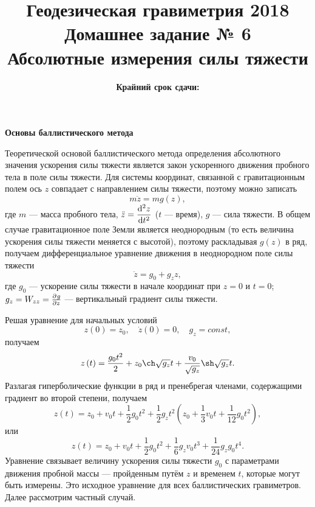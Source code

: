\documentclass[12pt, a4paper]{article}
\title{{\Large Геодезическая гравиметрия 2018}\\ 
    {\bf\Large Домашнее задание № 6} \\
    {\bf\Large Абсолютные измерения силы тяжести}
}
\author{}
\date{\normalsize\bf Крайний срок сдачи: \DTMusedate{deadline}}
\theoremstyle{remark}
\begin{document}
\maketitle
\thispagestyle{empty}
\begin{center}
    \textbf{Основы баллистического метода}
\end{center}

Теоретической основой баллистического метода определения абсолютного значения ускорения силы тяжести
является закон ускоренного движения пробного тела в поле силы тяжести. Для системы координат,
связанной с гравитационным полем ось $z$ совпадает с направлением силы тяжести, поэтому можно записать
\begin{equation*}
    m \ddot{z} = mg\left( z \right),
\end{equation*}
где $m$ --- масса пробного тела, $\ddot{z} = \dod[2]{z}{t}$ ($t$ --- время),
$g$ --- сила тяжести. 
В общем случае гравитационное поле Земли является неоднородным (то есть величина ускорения силы
тяжести меняется с высотой), поэтому раскладывая $g\left( z
\right)$ в ряд, получаем дифференциальное уравнение движения в неоднородном поле
силы тяжести
\begin{equation*}
    \ddot{z} = g_0 + g_z z,
\end{equation*}
где $g_0$ --- ускорение силы тяжести в начале координат при $z = 0$ и $t = 0$; $g_z = W_{zz} =
\pd{g}{z}$ --- вертикальный градиент силы тяжести.

Решая уравнение для начальных условий 
\begin{equation*}
    z\left( 0 \right) = z_0,\quad \dot{z}\left( 0 \right) = 0,\quad g_z = const, 
\end{equation*}
получаем
\begin{equation*}
    z\left( t \right) = \dfrac{g_0 t^2}{2} + z_0\ch\sqrt{g_z}t +
    \dfrac{v_0}{\sqrt{g_z}}\sh\sqrt{g_z}t.
\end{equation*}
Разлагая гиперболические функции в ряд и пренебрегая членами, содержащими градиент во второй
степени, получаем
\begin{equation*}
    z\left( t \right) = z_0 + v_0t + \dfrac{1}{2} g_0 t^2 + \dfrac{1}{2}g_zt^2\left( 
        z_0 + \dfrac{1}{3} v_0 t + \dfrac{1}{12} g_0 t^2
    \right),
\end{equation*}
или
\begin{equation}
    \label{eq:basic-freefall}
    z\left( t \right) = z_0 + v_0t + \dfrac{1}{2} g_0 t^2 + 
    \dfrac{1}{6}g_z v_0 t^3 +  
    \dfrac{1}{24}g_z g_0 t^4.
\end{equation}
Уравнение связывает величину ускорения силы тяжести $g_0$ с параметрами движения пробной массы ---
пройденным путём $z$ и временем $t$, которые могут быть измерены. Это исходное уравнение для всех
баллистических гравиметров. Далее рассмотрим частный случай.
\end{document}
